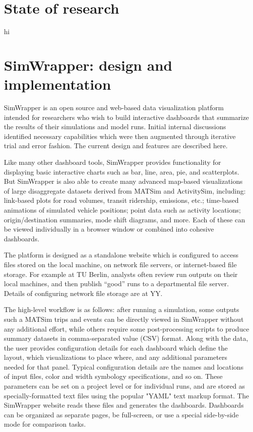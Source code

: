 \documentclass[3p,times,procedia]{elsarticle}
\begin{document}
\section{State of research}

hi

\section{SimWrapper: design and implementation}

SimWrapper is an open source and web-based data visualization platform intended for researchers who wish to build interactive dashboards that summarize the results of their simulations and model runs. Initial internal discussions identified necessary capabilities which were then augmented through iterative trial and error fashion. The current design and features are described here.

Like many other dashboard tools, SimWrapper provides functionality for displaying basic interactive charts such as bar, line, area, pie, and scatterplots. But SimWrapper is also able to create many advanced map-based visualizations of large disaggregate datasets derived from MATSim and ActivitySim, including: link-based plots for road volumes, transit ridership, emissions, etc.; time-based animations of simulated vehicle positions; point data such as activity locations; origin/destination summaries, mode shift diagrams, and more. Each of these can be viewed individually in a browser window or combined into cohesive dashboards.

The platform is designed as a standalone website which is configured to access files stored on the local machine, on network file servers, or internet-based file storage. For example at TU Berlin, analysts often review run outputs on their local machines, and then publish “good” runs to a departmental file server. Details of configuring network file storage are at YY.

The high-level workflow is as follows: after running a simulation, some outputs such a MATSim trips and events can be directly viewed in SimWrapper without any additional effort, while others require some post-processing scripts to produce summary datasets in comma-separated value (CSV) format. Along with the data, the user provides configuration details for each dashboard which define the layout, which visualizations to place where, and any additional parameters needed for that panel. Typical configuration details are the names and locations of input files, color and width symbology specifications, and so on. These parameters can be set on a project level or for individual runs, and are stored as specially-formatted text files using the popular "YAML" text markup format. The SimWrapper website reads these files and generates the dashboards. Dashboards can be organized as separate pages, be full-screen, or use a special side-by-side mode for comparison tasks.
\end{document}
